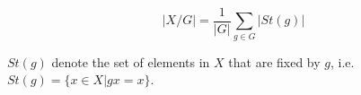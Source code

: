 $$|X/G| = \frac{1}{|G|}\sum\limits_{g \in G}|St(g)|$$

$St(g)$ denote the set of elements in $X$ that are fixed by $g$, i.e. $St(g) = \{x \in X | gx = x\}$.